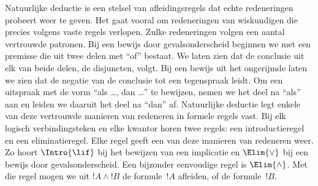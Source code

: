 \documentclass[openany]{memoir}
\begin{document}
\begingroup
\def\olfilename{OLP-0066}
\def\olfilepath{content/first-order-logic/proof-systems/}
\hypertarget{unit-OLP-0066}{}



      {}
      {}


Natuurlijke deductie is een stelsel van afleidingsregels dat echte
redeneringen probeert weer te geven. Het gaat vooral om redeneringen
van wiskundigen die precies volgens vaste regels verlopen. Zulke
redeneringen volgen een aantal vertrouwde patronen. Bij een bewijs door
gevalsonderscheid beginnen we met een premisse die uit twee delen met
``of'' bestaat. We laten zien dat de conclusie uit elk van beide delen,
de disjuncten, volgt. Bij een bewijs uit het ongerijmde laten we zien
dat de negatie van de conclusie tot een tegenspraak leidt. Om een
uitspraak met de vorm ``als \dots, dan \dots'' te bewijzen, nemen we
het deel na ``als'' aan en leiden we daaruit het deel na ``dan'' af.
Natuurlijke deductie legt enkele van deze vertrouwde manieren van
redeneren in formele regels vast. Bij elk logisch verbindingsteken en
elke kwantor horen twee regels: een introductieregel en een
eliminatieregel. Elke regel geeft een van deze manieren van
redeneren weer. Zo hoort $\Intro{\lif}$ bij het bewijzen van een
implicatie en $\Elim{\lor}$ bij een bewijs door gevalsonderscheid. Een
bijzonder eenvoudige regel is $\Elim{\land}$. Met die regel mogen we
uit $!A \land !B$ de formule~$!A$ afleiden, of de formule~$!B$.
\end{document}
